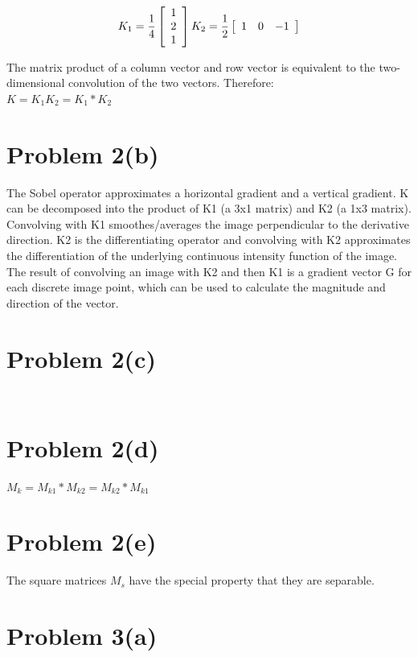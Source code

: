 \documentclass{article}
\begin{document}
\[
K_1 = \frac{1}{4}\left[\begin{array}{*{3}c}
 1\\
 2\\
 1
\end{array}\right]
K_2 = \frac{1}{2}\left[\begin{array}{*{3}c}
 1 & 0 & -1
\end{array}\right]
\]

The matrix product of a column vector and row vector is equivalent to the two-dimensional convolution of the two vectors. Therefore:\\

$K = K_1K_2 = K_1 \ast K_2$

\section*{Problem 2(b)}

The Sobel operator approximates a horizontal gradient and a vertical gradient. K can be decomposed into the product of K1 (a 3x1 matrix) and K2 (a 1x3 matrix).
Convolving with K1 smoothes/averages the image perpendicular to the derivative direction.
K2 is the differentiating operator and convolving with K2 approximates the differentiation of the underlying continuous intensity function of the image. The result of convolving an image with K2 and then K1 is a gradient vector G for each discrete image point, which can be used to calculate the magnitude and direction of the vector.

\section*{Problem 2(c)}

\[
    
\]

\[
    
\]

\section*{Problem 2(d)}

$M_k = M_{k1} \ast M_{k2} = M_{k2} \ast M_{k1}$

\section*{Problem 2(e)}

The square matrices $M_s$ have the special property that they are separable.

\newpage
\section*{Problem 3(a)}
\end{document}
